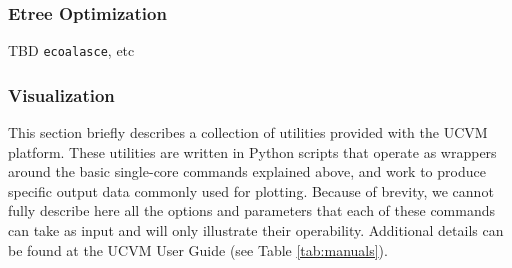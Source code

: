 \subsubsection{Etree Optimization}

TBD \texttt{ecoalasce}, etc

\subsubsection{Visualization}



This section briefly describes a collection of utilities provided with the UCVM platform. These utilities are written in Python scripts that operate as wrappers around the basic single-core commands explained above, and work to produce specific output data commonly used for plotting. Because of brevity, we cannot fully describe here all the options and parameters that each of these commands can take as input and will only illustrate their operability. Additional details can be found at the UCVM User Guide (see Table \ref{tab:manuals}).
